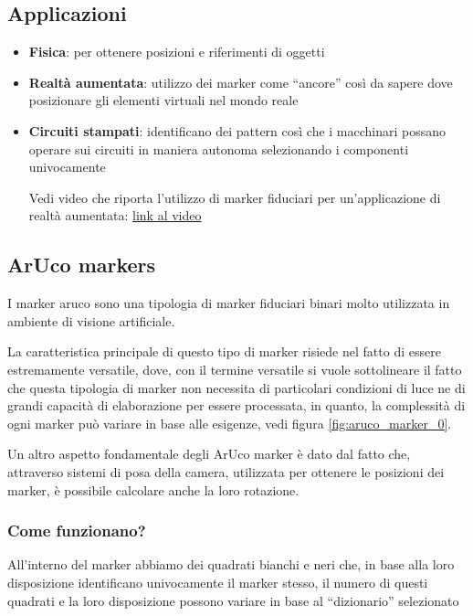 \documentclass[12pt,a4paper,openright,twoside]{book}
\begin{document}
\subsection{Applicazioni}
\begin{itemize}
	\item \textbf{Fisica}: per ottenere posizioni e riferimenti di oggetti
	\item \textbf{Realtà aumentata}: utilizzo dei marker come ``ancore'' così da sapere dove posizionare gli elementi virtuali nel mondo reale
	\item \textbf{Circuiti stampati}: identificano dei pattern così che i macchinari possano operare sui circuiti in maniera autonoma selezionando i componenti univocamente
	
	
	Vedi video che riporta l'utilizzo di marker fiduciari per un'applicazione di realtà aumentata:
	\href{https://youtu.be/nsu9tNIJ6F0?si=MB4zTZP5yiCO9aW7}{link al video}
\end{itemize}

\subsection{ArUco markers} \label{subsec:aruco_markers}
I marker \acrfull{aruco} sono una tipologia di marker fiduciari binari molto utilizzata in ambiente di visione artificiale.

La caratteristica principale di questo tipo di marker risiede nel fatto di essere estremamente versatile, dove,
con il termine versatile si vuole sottolineare il fatto che questa tipologia di marker non necessita di particolari condizioni di luce ne di grandi capacità di elaborazione per essere processata, in quanto, la complessità di ogni marker può variare in base alle esigenze, vedi figura \ref{fig:aruco_marker_0}.

Un altro aspetto fondamentale degli ArUco marker è dato dal fatto che, attraverso sistemi di posa della camera, utilizzata per ottenere le posizioni dei marker, è possibile calcolare anche la loro rotazione.

\subsubsection{Come funzionano?}
All'interno del marker abbiamo dei quadrati bianchi e neri che, in base alla loro disposizione identificano univocamente il marker stesso, il numero di questi quadrati e la loro disposizione possono variare in base al ``dizionario'' selezionato
\end{document}
